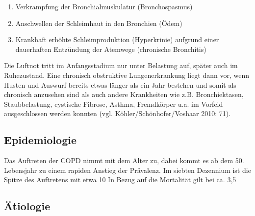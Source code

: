 \begin{enumerate}
\item Verkrampfung der Bronchialmuskulatur (Bronchospasmus)
\item Anschwellen der Schleimhaut in den Bronchien (Ödem)
\item Krankhaft erhöhte Schleimproduktion (Hyperkrinie) aufgrund einer dauerhaften Entzündung der Atemwege (chronische Bronchitis)
\end{enumerate}

Die Luftnot tritt im Anfangsstadium nur unter Belastung auf, später auch im Ruhezustand.
Eine chronisch obstruktive Lungenerkrankung liegt dann vor, wenn Husten und Auswurf bereits etwas länger als ein Jahr bestehen und somit als chronisch anzusehen sind als auch andere Krankheiten wie z.B. Bronchiektasen, Staubbelastung, cystische Fibrose, Asthma, Fremdkörper u.a. im Vorfeld ausgeschlossen werden konnten (vgl. Köhler/Schönhofer/Voshaar 2010: 71).

\subsection{Epidemiologie}
Das Auftreten der COPD nimmt mit dem Alter zu, dabei kommt es ab dem 50. Lebensjahr zu einem rapiden Anstieg der Prävalenz. Im siebten Dezennium ist die Spitze des Auftretens mit etwa 10 %
In Bezug auf die Mortalität gilt bei ca. 3,5 %

\subsection{Ätiologie}

